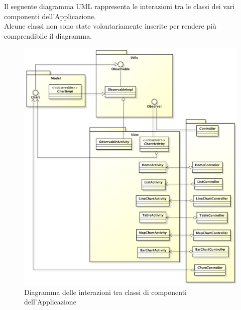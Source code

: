 Il seguente diagramma UML rappresenta le interazioni tra le classi dei vari componenti dell'Applicazione.\\
	Alcune classi non sono state volontariamente inserite per rendere più comprendibile il diagramma.

	\begin{figure}[H]\centering
		\includegraphics[width=\textwidth]{SpecificaTecnica/Pics/InterazioniComponentiApplicazione.pdf}
		\caption{Diagramma delle interazioni tra classi di componenti dell'Applicazione}
	\end{figure}